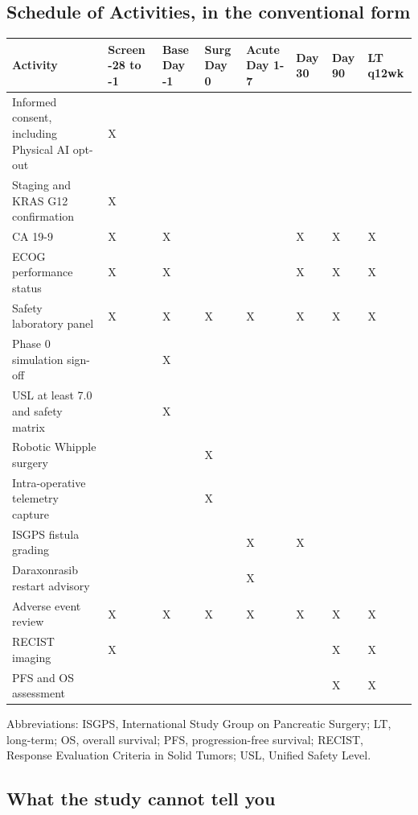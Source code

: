\subsection{Schedule of Activities, in the conventional form}

\vspace{0.30em}

\noindent\begin{tabularx}{\textwidth}{L{3.9cm} C{1.55cm} C{1.15cm} C{1.05cm} C{1.35cm} C{0.95cm} C{0.95cm} Y}
\toprule
\textbf{Activity} & \textbf{Screen -28 to -1} & \textbf{Base Day -1} & \textbf{Surg Day 0} & \textbf{Acute Day 1-7} & \textbf{Day 30} & \textbf{Day 90} & \textbf{LT q12wk} \\
\midrule
Informed consent, including Physical AI opt-out & X & & & & & & \\
Staging and KRAS G12 confirmation & X & & & & & & \\
CA 19-9 & X & X & & & X & X & X \\
ECOG performance status & X & X & & & X & X & X \\
Safety laboratory panel & X & X & X & X & X & X & X \\
Phase 0 simulation sign-off & & X & & & & & \\
USL at least 7.0 and safety matrix & & X & & & & & \\
Robotic Whipple surgery & & & X & & & & \\
Intra-operative telemetry capture & & & X & & & & \\
ISGPS fistula grading & & & & X & X & & \\
Daraxonrasib restart advisory & & & & X & & & \\
Adverse event review & X & X & X & X & X & X & X \\
RECIST imaging & X & & & & & X & X \\
PFS and OS assessment & & & & & & X & X \\
\bottomrule
\end{tabularx}

\vspace{0.30em}

\noindent Abbreviations: ISGPS, International Study Group on Pancreatic Surgery;
LT, long-term; OS, overall survival; PFS, progression-free survival; RECIST,
Response Evaluation Criteria in Solid Tumors; USL, Unified Safety Level.

\subsection{What the study cannot tell you}

